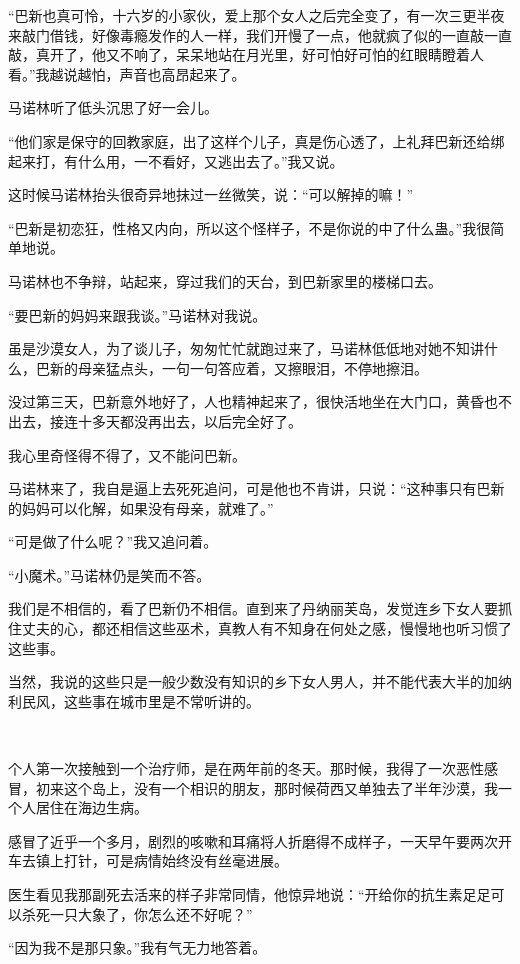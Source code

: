 \par “巴新也真可怜，十六岁的小家伙，爱上那个女人之后完全变了，有一次三更半夜来敲门借钱，好像毒瘾发作的人一样，我们开慢了一点，他就疯了似的一直敲一直敲，真开了，他又不响了，呆呆地站在月光里，好可怕好可怕的红眼睛瞪着人看。”我越说越怕，声音也高昂起来了。
\par 马诺林听了低头沉思了好一会儿。
\par “他们家是保守的回教家庭，出了这样个儿子，真是伤心透了，上礼拜巴新还给绑起来打，有什么用，一不看好，又逃出去了。”我又说。
\par 这时候马诺林抬头很奇异地抹过一丝微笑，说：“可以解掉的嘛！”
\par “巴新是初恋狂，性格又内向，所以这个怪样子，不是你说的中了什么蛊。”我很简单地说。
\par 马诺林也不争辩，站起来，穿过我们的天台，到巴新家里的楼梯口去。
\par “要巴新的妈妈来跟我谈。”马诺林对我说。
\par 虽是沙漠女人，为了谈儿子，匆匆忙忙就跑过来了，马诺林低低地对她不知讲什么，巴新的母亲猛点头，一句一句答应着，又擦眼泪，不停地擦泪。
\par 没过第三天，巴新意外地好了，人也精神起来了，很快活地坐在大门口，黄昏也不出去，接连十多天都没再出去，以后完全好了。
\par 我心里奇怪得不得了，又不能问巴新。
\par 马诺林来了，我自是逼上去死死追问，可是他也不肯讲，只说：“这种事只有巴新的妈妈可以化解，如果没有母亲，就难了。”
\par “可是做了什么呢？”我又追问着。
\par “小魔术。”马诺林仍是笑而不答。
\par 我们是不相信的，看了巴新仍不相信。直到来了丹纳丽芙岛，发觉连乡下女人要抓住丈夫的心，都还相信这些巫术，真教人有不知身在何处之感，慢慢地也听习惯了这些事。
\par 当然，我说的这些只是一般少数没有知识的乡下女人男人，并不能代表大半的加纳利民风，这些事在城市里是不常听讲的。
\par  
\par 个人第一次接触到一个治疗师，是在两年前的冬天。那时候，我得了一次恶性感冒，初来这个岛上，没有一个相识的朋友，那时候荷西又单独去了半年沙漠，我一个人居住在海边生病。
\par 感冒了近乎一个多月，剧烈的咳嗽和耳痛将人折磨得不成样子，一天早午要两次开车去镇上打针，可是病情始终没有丝毫进展。
\par 医生看见我那副死去活来的样子非常同情，他惊异地说：“开给你的抗生素足足可以杀死一只大象了，你怎么还不好呢？”
\par “因为我不是那只象。”我有气无力地答着。
